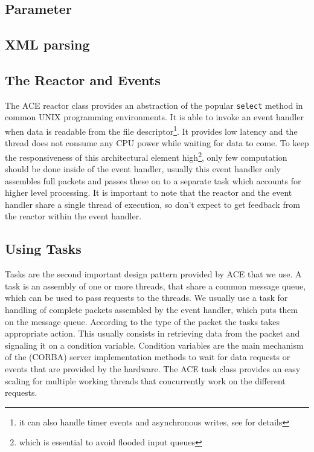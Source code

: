 \subsection{Parameter}

\subsection{XML parsing}

\subsection{The Reactor and Events}

The ACE reactor class provides an abstraction of the popular
{\tt select} method in common UNIX programming environments. It is
able to invoke an event handler when data is readable from the file
descriptor\footnote{it can also handle timer events and asynchronous
  writes, see \cite{ACE-Manual} for details}. It provides low
latency and the thread does not consume any CPU power while waiting
for data to come. To keep the responsiveness of this architectural
element high\footnote{which is essential to avoid flooded input
  queues}, only few computation should be done inside of the event
handler, usually this event handler only assembles full packets and
passes these on to a separate task which accounts for higher level
processing. It is important to note that the reactor and the event
handler share a single thread of execution, so don't expect to get
feedback from the reactor within the event handler. 


\subsection{Using Tasks}

Tasks are the second important design pattern provided by ACE that we use.
A task is an assembly of one or more threads, that share a common
message queue, which can be used to pass requests to the threads. We
usually use a task for handling of complete packets assembled by the
event handler, which puts them on the message queue. According to the
type of the packet the tasks takes appropriate action. This usually
consists in retrieving data from the packet and signaling it on a
condition variable. Condition variables are the main mechanism of the
(CORBA) server implementation methods to wait for data requests or
events that are provided by the hardware. The ACE task class provides
an easy scaling for multiple working threads that concurrently work on 
the different requests.

